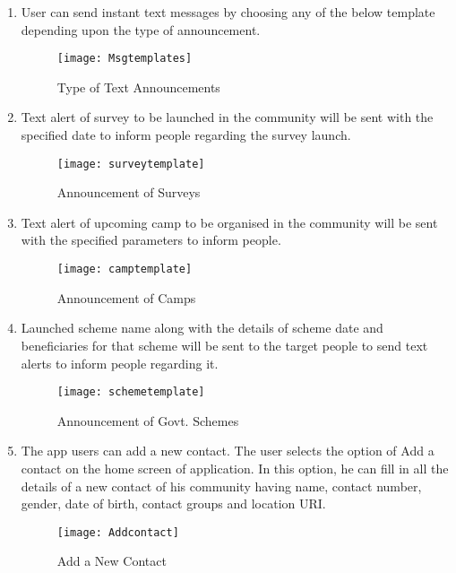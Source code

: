 \begin {enumerate}
\item User can send instant text messages by choosing any of the below template depending upon the type of announcement.
\begin{figure}[H]
\begin{center}   
\texttt{[image: Msgtemplates]}
\caption{Type of Text Announcements}
\label{fig:message}
\end{center}
\end{figure}

\item Text alert of survey to be launched in the community will be sent with the specified date to inform people regarding the survey launch.
\begin{figure}[H]
\begin{center}   
\texttt{[image: surveytemplate]}
\caption{Announcement of Surveys}
\label{fig:message1}
\end{center}
\end{figure}

\item Text alert of upcoming camp to be organised in the community will be sent with the specified parameters to inform people. 
\begin{figure}[H]
\begin{center}   
\texttt{[image: camptemplate]}
\caption{Announcement of Camps}
\label{fig:message2}
\end{center}
\end{figure}


\item  Launched scheme name along with the details of scheme date and beneficiaries for that scheme will be sent to the target people to send text alerts to inform people regarding it.
\begin{figure}[H]
\begin{center}   
\texttt{[image: schemetemplate]}
\caption{Announcement of Govt. Schemes}
\label{fig:message3}
\end{center}
\end{figure}

\item The app users can add a new contact. The user selects the option of Add a contact on the  home screen of application. In this option, he can fill in all the details of a new contact of his community having name, contact number, gender, date of birth, contact groups and location URI.
\begin{figure}[H]
\begin{center}   
\texttt{[image: Addcontact]}
\caption{Add a New Contact}
\label{fig:contact1}
\end{center}
\end{figure}


\end{enumerate}
